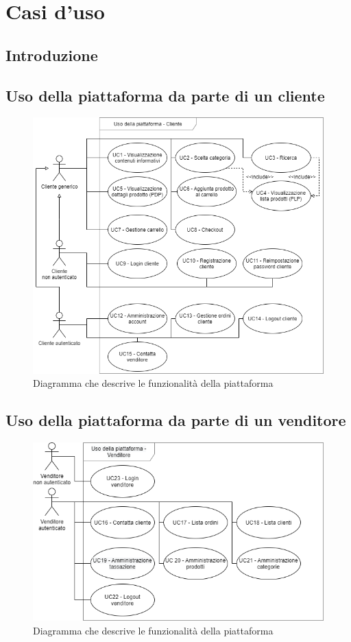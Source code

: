 \section{Casi d'uso}
\subsection{Introduzione}
\subsection{Uso della piattaforma da parte di un cliente}
\begin{figure}[H]
    \centering
    \includegraphics[width=\linewidth]{res/images/UC/cliente.png}
    \caption{Diagramma che descrive le funzionalità della piattaforma} 
\end{figure}
\subsection{Uso della piattaforma da parte di un venditore}
\begin{figure}[H]
    \centering
    \includegraphics[width=\linewidth]{res/images/UC/venditore.png}
    \caption{Diagramma che descrive le funzionalità della piattaforma} 
\end{figure}

